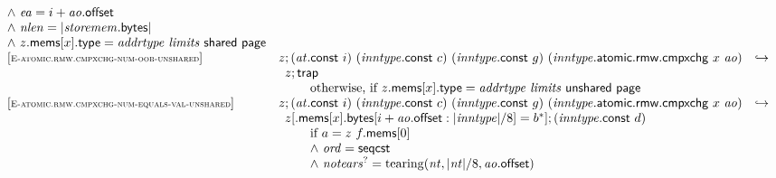 $$\begin{array}[t]{@{}lrcl@{}l@{}}
{\begin{array}[t]{@{}l@{}}
{\land}~ {\mathit{ea}} = i + {\mathit{ao}}{.}\mathsf{offset} \\
{\land}~ {\mathit{nlen}} = {|{\mathit{storemem}}{.}\mathsf{bytes}|} \\
{\land}~ z{.}\mathsf{mems}{}[x]{.}\mathsf{type} = {\mathit{addrtype}}~{\mathit{limits}}~\mathsf{shared}~\mathsf{page} \\
\end{array}
} \\
{[\textsc{\scriptsize E{-}atomic.rmw.cmpxchg{-}num{-}oob{-}unshared}]} \quad & z ; ({\mathit{at}}{.}\mathsf{const}~i)~({\mathit{inntype}}{.}\mathsf{const}~c)~({\mathit{inntype}}{.}\mathsf{const}~g)~({\mathit{inntype}}{.}\mathsf{atomic}{.}\mathsf{rmw}{.}\mathsf{cmpxchg}~x~{\mathit{ao}}) & \hookrightarrow & & \\
& \multicolumn{4}{@{}l@{}}{\quad
\begin{array}[t]{@{}l@{}l@{}l@{}}
z ; \mathsf{trap} & & \\
 \multicolumn{3}{@{}l@{}}{\quad
\begin{array}[t]{@{}l@{}}
\quad \mbox{otherwise, if}~ z{.}\mathsf{mems}{}[x]{.}\mathsf{type} = {\mathit{addrtype}}~{\mathit{limits}}~\mathsf{unshared}~\mathsf{page} \\
\end{array}
} \\
\end{array}
} \\
{[\textsc{\scriptsize E{-}atomic.rmw.cmpxchg{-}num{-}equals{-}val{-}unshared}]} \quad & z ; ({\mathit{at}}{.}\mathsf{const}~i)~({\mathit{inntype}}{.}\mathsf{const}~c)~({\mathit{inntype}}{.}\mathsf{const}~g)~({\mathit{inntype}}{.}\mathsf{atomic}{.}\mathsf{rmw}{.}\mathsf{cmpxchg}~x~{\mathit{ao}}) & \hookrightarrow & & \\
& \multicolumn{4}{@{}l@{}}{\quad
\begin{array}[t]{@{}l@{}l@{}l@{}}
z{}[{.}\mathsf{mems}{}[x]{.}\mathsf{bytes}{}[i + {\mathit{ao}}{.}\mathsf{offset} : {|{\mathit{inntype}}|} / 8] = {b^\ast}] ; ({\mathit{inntype}}{.}\mathsf{const}~d) & & \\
 \multicolumn{3}{@{}l@{}}{\quad
\begin{array}[t]{@{}l@{}}
\quad
\begin{array}[t]{@{}l@{}}
\mbox{if}~ a = z~f{.}\mathsf{mems}{}[0] \\
{\land}~ {\mathit{ord}} = \mathsf{seqcst} \\
{\land}~ {{\mathit{notears}}^?} = {\mathrm{tearing}}({\mathit{nt}}, {|{\mathit{nt}}|} / 8, {\mathit{ao}}{.}\mathsf{offset}) \\

\end{array}
\end{array}}
\end{array}}
\end{array}$$
